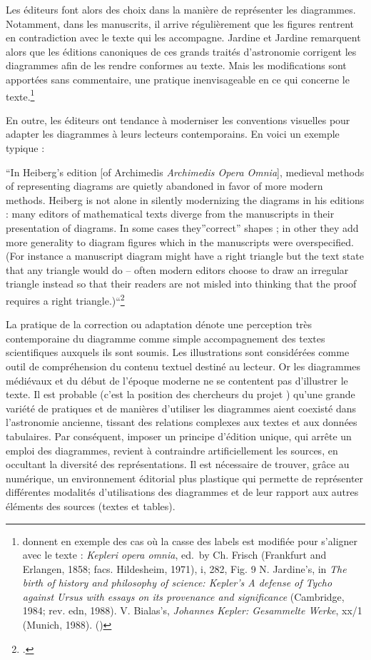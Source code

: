 Les éditeurs font alors des choix dans la manière de représenter les
diagrammes. Notamment, dans les manuscrits, il arrive régulièrement que
les figures rentrent en contradiction avec le texte qui les accompagne.
Jardine et Jardine remarquent alors que les éditions canoniques de ces
grands traités d'astronomie corrigent les diagrammes afin de les rendre
conformes au texte. Mais les modifications sont apportées sans
commentaire, une pratique inenvisageable en ce qui concerne le
texte.\footnote{\citeauthor{jardine_critical_2010} donnent
  en exemple des cas où la casse des labels est modifiée pour s'aligner
  avec le texte : \emph{Kepleri opera omnia}, ed.~by Ch. Frisch
  (Frankfurt and Erlangen, 1858; facs. Hildesheim, 1971), i, 282, Fig. 9
  N. Jardine's, in \emph{The birth of history and philosophy of science:
  Kepler's A defense of Tycho against Ursus with essays on its
  provenance and significance} (Cambridge, 1984; rev. edn, 1988). V.
  Bialas's, \emph{Johannes Kepler: Gesammelte Werke}, xx/1 (Munich,
  1988). (\cite[p.411]{jardine_critical_2010})}

En outre, les éditeurs ont tendance à moderniser les conventions
visuelles pour adapter les diagrammes à leurs lecteurs contemporains. En
voici un exemple typique :

\begin{kwote}
``In Heiberg's edition {[}of Archimedis \emph{Archimedis Opera
Omnia}{]}, medieval methods of representing diagrams are quietly
abandoned in favor of more modern methods. Heiberg is not alone in
silently modernizing the diagrams in his editions : many editors of
mathematical texts diverge from the manuscripts in their presentation of
diagrams. In some cases they''correct'' shapes ; in other they add more
generality to diagram figures which in the manuscripts were
overspecified. (For instance a manuscript diagram might have a right
triangle but the text state that any triangle would do -- often modern
editors choose to draw an irregular triangle instead so that their
readers are not misled into thinking that the proof requires a right
triangle.)``\footcite[p.78]{roughan_digital_2014}
\end{kwote}

La pratique de la correction ou adaptation dénote une perception très
contemporaine du diagramme comme simple accompagnement des textes
scientifiques auxquels ils sont soumis. Les illustrations sont
considérées comme outil de compréhension du contenu textuel destiné au
lecteur. Or les diagrammes médiévaux et du début de l'époque moderne ne
se contentent pas d'illustrer le texte. Il est probable (c'est la position des chercheurs du projet \eida) qu'une grande variété de pratiques et de manières d'utiliser les diagrammes aient coexisté dans l'astronomie ancienne, tissant des relations complexes aux textes et aux données tabulaires. Par conséquent, imposer un principe d'édition unique, qui arrête un emploi des diagrammes, revient à contraindre artificiellement les sources, en occultant la diversité des représentations. Il est nécessaire de trouver, grâce au numérique, un environnement éditorial plus plastique qui permette de représenter différentes modalités d'utilisations des diagrammes et de leur rapport aux autres éléments des sources (textes et tables).

